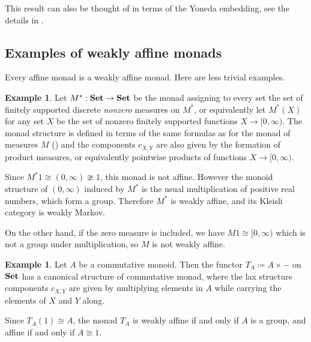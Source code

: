 \documentclass[a4paper,UKenglish,numberwithinsect,cleveref, autoref, thm-restate]{lipics-v2021}
\theoremstyle{plain} %
\theoremstyle{definition} %
\newtheorem{myexample}[mytheorem]{Example}
\begin{document}
This result can also be thought of in terms of the Yoneda embedding, see the details in .


\subsection{Examples of weakly affine monads} 

Every affine monad is a weakly affine monad. Here are less trivial examples.

\begin{myexample}
    \label{ex:nonzero_measures}
	Let $M^* : \mathbf{Set} \to \mathbf{Set}$ be the monad assigning to every set the set of finitely supported discrete \emph{nonzero}
	measures on $M^*$, or equivalently let $M^*(X)$ for any set $X$ be the set of nonzero finitely supported functions $X \to [0,\infty)$.
	The monad structure is defined in terms of the same formulas as for the monad of measures $M$ () and the
	components $c_{X,Y}$ are also given by the formation of product measures, or equivalently pointwise products of functions 
	$X \to [0,\infty)$.

	Since $M^* 1 \cong (0,\infty)\ncong 1$, this monad is not affine. However the monoid structure of $(0,\infty)$ induced by $M^*$ is the usual multiplication of positive real numbers, which form a group. Therefore $M^*$ is weakly affine, and its Kleisli category is weakly Markov.


	On the other hand, if the zero measure is included, we have $M1 \cong [0,\infty)$ which is not a group under multiplication, so $M$ is not weakly affine.
\end{myexample}

\begin{myexample}
	\label{ex:abelian_group}
	Let $A$ be a commutative monoid.
	Then the functor $T_A \coloneqq A \times -$ on $\mathbf{Set}$ has a canonical structure of commutative monad, 
	where the lax structure components $c_{X,Y}$ are given by multiplying elements in $A$ while carrying the elements 
	of $X$ and $Y$ along.

	Since $T_A(1) \cong A$, the monad $T_A$ is weakly affine if and only if $A$ is a group, and affine if and only if $A\cong 1$.
\end{myexample}
\end{document}
